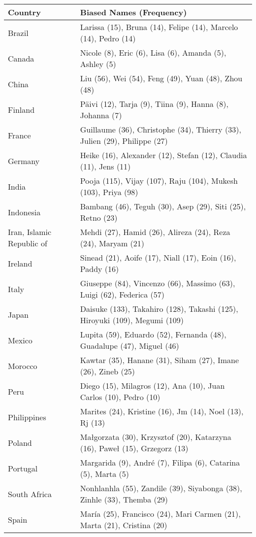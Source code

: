 \begin{table*}[ht]
\centering
\begin{tabular}{ll}
\hline
\textbf{Country} & \textbf{Biased Names (Frequency)} \\
\hline
Brazil & Larissa (15), Bruna (14), Felipe (14), Marcelo (14), Pedro (14) \\
Canada & Nicole (8), Eric (6), Lisa (6), Amanda (5), Ashley (5) \\
China & Liu (56), Wei (54), Feng (49), Yuan (48), Zhou (48) \\

Finland & Päivi (12), Tarja (9), Tiina (9), Hanna (8), Johanna (7) \\
France & Guillaume (36), Christophe (34), Thierry (33), Julien (29), Philippe (27) \\
Germany & Heike (16), Alexander (12), Stefan (12), Claudia (11), Jens (11) \\
India & Pooja (115), Vijay (107), Raju (104), Mukesh (103), Priya (98) \\
Indonesia & Bambang (46), Teguh (30), Asep (29), Siti (25), Retno (23) \\
Iran, Islamic Republic of & Mehdi (27), Hamid (26), Alireza (24), Reza (24), Maryam (21) \\
Ireland & Sinead (21), Aoife (17), Niall (17), Eoin (16), Paddy (16) \\
Italy & Giuseppe (84), Vincenzo (66), Massimo (63), Luigi (62), Federica (57) \\
Japan & Daisuke (133), Takahiro (128), Takashi (125), Hiroyuki (109), Megumi (109) \\
Mexico & Lupita (59), Eduardo (52), Fernanda (48), Guadalupe (47), Miguel (46) \\
Morocco & Kawtar (35), Hanane (31), Siham (27), Imane (26), Zineb (25) \\
Peru & Diego (15), Milagros (12), Ana (10), Juan Carlos (10), Pedro (10) \\
Philippines & Marites (24), Kristine (16), Jm (14), Noel (13), Rj (13) \\
Poland & Małgorzata (30), Krzysztof (20), Katarzyna (16), Paweł (15), Grzegorz (13) \\
Portugal & Margarida (9), André (7), Filipa (6), Catarina (5), Marta (5) \\
South Africa & Nonhlanhla (55), Zandile (39), Siyabonga (38), Zinhle (33), Themba (29) \\
Spain & María (25), Francisco (24), Mari Carmen (21), Marta (21), Cristina (20) \\

\end{tabular}
\end{table*}
